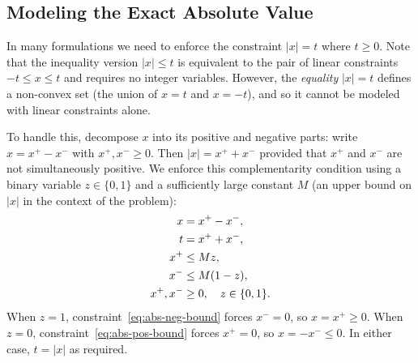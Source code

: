 %
%
%

\subsection{Modeling the Exact Absolute Value}
In many formulations we need to enforce the constraint $|x| = t$ where $t \geq 0$.
Note that the inequality version $|x| \leq t$ is equivalent to the pair of linear constraints $-t \leq x \leq t$ and requires no integer variables.
However, the \emph{equality} $|x| = t$ defines a non-convex set (the union of $x = t$ and $x = -t$), and so it cannot be modeled with linear constraints alone.

To handle this, decompose $x$ into its positive and negative parts: write $x = x^+ - x^-$ with $x^+, x^- \geq 0$.
Then $|x| = x^+ + x^-$ provided that $x^+$ and $x^-$ are not simultaneously positive.
We enforce this complementarity condition using a binary variable $z \in \{0,1\}$ and a sufficiently large constant $M$ (an upper bound on $|x|$ in the context of the problem):
\begin{align}
x &= x^+ - x^-, \notag\\
t &= x^+ + x^-, \notag\\
x^+ &\leq Mz, \label{eq:abs-pos-bound}\\
x^- &\leq M(1-z), \label{eq:abs-neg-bound}\\
x^+, x^- &\geq 0, \quad z \in \{0,1\}. \notag
\end{align}
When $z=1$, constraint~\eqref{eq:abs-neg-bound} forces $x^- = 0$, so $x = x^+ \geq 0$.
When $z=0$, constraint~\eqref{eq:abs-pos-bound} forces $x^+ = 0$, so $x = -x^- \leq 0$.
In either case, $t = |x|$ as required.

